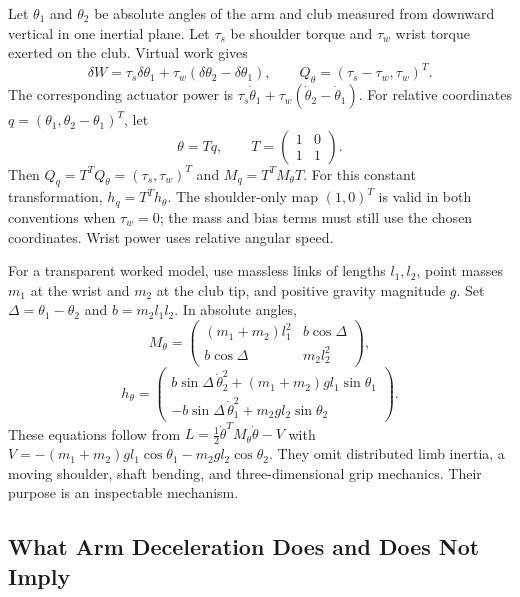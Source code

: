 \documentclass[12pt, openany]{book}
\theoremstyle{plain}
\begin{document}
Let $\theta_1$ and $\theta_2$ be absolute angles of the arm and club measured
from downward vertical in one inertial plane. Let $\tau_s$ be shoulder torque
and $\tau_w$ wrist torque exerted on the club. Virtual work gives
\begin{equation}
\delta W=\tau_s\delta\theta_1+\tau_w(\delta\theta_2-\delta\theta_1),
\qquad Q_\theta=(\tau_s-\tau_w,\tau_w)^T.
\end{equation}
The corresponding actuator power is
$\tau_s\dot\theta_1+\tau_w(\dot\theta_2-\dot\theta_1)$.
For relative coordinates $q=(\theta_1,\theta_2-\theta_1)^T$, let
\begin{equation}
\theta=Tq,\qquad T=\begin{pmatrix}1&0\\1&1\end{pmatrix}.
\end{equation}
Then $Q_q=T^TQ_\theta=(\tau_s,\tau_w)^T$ and $M_q=T^TM_\theta T$.
For this constant transformation, $h_q=T^Th_\theta$. The shoulder-only map
$(1,0)^T$ is valid in both conventions when $\tau_w=0$; the mass and bias terms
must still use the chosen coordinates. Wrist power uses relative angular speed.

For a transparent worked model, use massless links of lengths $l_1,l_2$,
point masses $m_1$ at the wrist and $m_2$ at the club tip, and positive gravity
magnitude $g$. Set $\Delta=\theta_1-\theta_2$ and $b=m_2l_1l_2$. In absolute angles,
\begin{equation}
M_\theta=\begin{pmatrix}
(m_1+m_2)l_1^2&b\cos\Delta\\
b\cos\Delta&m_2l_2^2
\end{pmatrix},
\end{equation}
\begin{equation}
h_\theta=\begin{pmatrix}
b\sin\Delta\,\dot\theta_2^2+(m_1+m_2)gl_1\sin\theta_1\\
-b\sin\Delta\,\dot\theta_1^2+m_2gl_2\sin\theta_2
\end{pmatrix}.
\end{equation}
These equations follow from $L=\tfrac12\dot\theta^TM_\theta\dot\theta-V$ with
$V=-(m_1+m_2)gl_1\cos\theta_1-m_2gl_2\cos\theta_2$.
They omit distributed limb inertia, a moving shoulder, shaft bending, and
three-dimensional grip mechanics. Their purpose is an inspectable mechanism.

\subsection{What Arm Deceleration Does and Does Not Imply}
\end{document}
